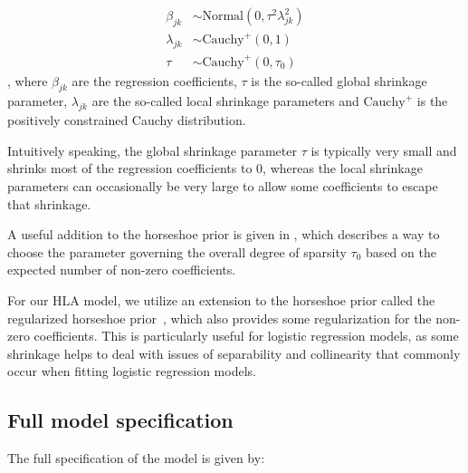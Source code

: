 \documentclass{bioinfo}
\begin{document}
\begin{methods}
\begin{equation}
  \begin{aligned}
    \beta_{jk} &\sim \text{Normal}(0, \tau^{2}\lambda^{2}_{jk}) \\
    \lambda_{jk} &\sim \text{Cauchy}^{+}(0, 1) \\
    \tau &\sim \text{Cauchy}^{+}(0, \tau_{0})
  \end{aligned}
\end{equation},
where \(\beta_{jk}\) are the regression coefficients, \(\tau\) is the so-called global shrinkage parameter, \(\lambda_{jk}\) are the so-called local shrinkage parameters and \(\text{Cauchy}^{+}\) is the positively constrained Cauchy distribution.

Intuitively speaking, the global shrinkage parameter \(\tau\) is typically very small and shrinks most of the regression coefficients to 0, whereas the local shrinkage parameters can occasionally be very large to allow some coefficients to escape that shrinkage.

A useful addition to the horseshoe prior is given in \citet{Piironen2017}, which describes a way to choose the parameter governing the overall degree of sparsity \(\tau_{0}\) based on the expected number of non-zero coefficients. 

For our HLA model, we utilize an extension to the horseshoe prior called the regularized horseshoe prior~\citep{Piironen2017}, which also provides some regularization for the non-zero coefficients. This is particularly useful for logistic regression models, as some shrinkage helps to deal with issues of separability and collinearity that commonly occur when fitting logistic regression models.

\subsection{Full model specification}

The full specification of the model is given by:


\end{methods}
\end{document}
